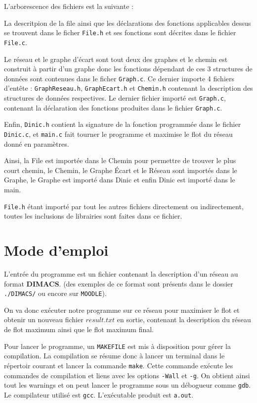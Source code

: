 \documentclass[11pt, a4paper]{report}
\begin{document}
	L'arborescence des fichiers est la suivante :
	
	
	La descritpion de la file ainsi que les déclarations des fonctions applicables dessus se trouvent dans le ficher \verb|File.h| et ses fonctions sont décrites dans le fichier \verb|File.c|.
	
	Le réseau et le graphe d'écart sont tout deux des graphes et le chemin est construit à partir d'un graphe donc les fonctions dépendant de ces 3 structures de données sont contenues dans le ficher \verb|Graph.c|. Ce dernier importe 4 fichiers d'entête : \verb|GraphReseau.h|, \verb|GraphEcart.h| et \verb|Chemin.h| contenant la description des structures de données respectives. Le dernier fichier importé est \verb|Graph.c|, contenant la déclaration des fonctions produites dans le fichier \verb|Graph.c|.
	
	Enfin, \verb|Dinic.h| contient la signature de la fonction programmée dans le fichier \verb|Dinic.c|, et \verb|main.c| fait tourner le programme et maximise le flot du réseau donné en paramètres.
	
	Ainsi, la File est importée dans le Chemin pour permettre de trouver le plus court chemin, le Chemin, le Graphe Écart et le Réseau sont importés dans le Graphe, le Graphe est importé dans Dinic et enfin Dinic est importé dans le main.
	
	\verb|File.h| étant importé par tout les autres fichiers directement ou indirectement, toutes les inclusions de librairies sont faites dans ce fichier.
	
	\chapter{Mode d'emploi}
	
	L'entrée du programme est un fichier contenant la description d'un réseau au format \textbf{DIMACS}. (des exemples de ce format sont présents dans le dossier \verb|./DIMACS/| ou encore sur \verb*|MOODLE|).
	
	On va donc exécuter notre programme sur ce réseau pour maximiser le flot et obtenir un nouveau fichier $result.txt$ en sortie, contenant la description du réseau de flot maximum ainsi que le flot maximum final.
	
	Pour lancer le programme, un \verb|MAKEFILE| est mis à disposition pour gérer la compilation. La compilation se résume donc à lancer un terminal dans le répertoir courant et lancer la commande \verb|make|. Cette commande exécute les commandes de compilation et liens avec les options \verb|-Wall| et \verb|-g|. On obtient ainsi tout les warnings et on peut lancer le programme sous un débogueur comme \verb|gdb|. Le compilateur utilisé est \verb|gcc|. L'exécutable produit est \verb|a.out|.
	
\end{document}
